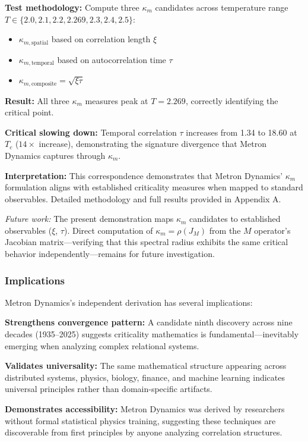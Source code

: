 \documentclass[11pt]{article}
\begin{document}
\textbf{Test methodology:} Compute three $\kappa_m$ candidates across temperature range $T \in \{2.0, 2.1, 2.2, 2.269, 2.3, 2.4, 2.5\}$:
\begin{itemize}[nosep]
    \item $\kappa_{m,\text{spatial}}$ based on correlation length $\xi$
    \item $\kappa_{m,\text{temporal}}$ based on autocorrelation time $\tau$
    \item $\kappa_{m,\text{composite}} = \sqrt{\xi\tau}$
\end{itemize}

\textbf{Result:} All three $\kappa_m$ measures peak at $T = 2.269$, correctly identifying the critical point.

\textbf{Critical slowing down:} Temporal correlation $\tau$ increases from 1.34 to 18.60 at $T_c$ ($14\times$ increase), demonstrating the signature divergence that Metron Dynamics captures through $\kappa_m$.

\textbf{Interpretation:} This correspondence demonstrates that Metron Dynamics' $\kappa_m$ formulation aligns with established criticality measures when mapped to standard observables. Detailed methodology and full results provided in Appendix A.

\textit{Future work:} The present demonstration maps $\kappa_m$ candidates to established observables ($\xi$, $\tau$). Direct computation of $\kappa_m = \rho(J_M)$ from the $M$ operator's Jacobian matrix---verifying that this spectral radius exhibits the same critical behavior independently---remains for future investigation.

\subsubsection{Implications}

Metron Dynamics's independent derivation has several implications:

\textbf{Strengthens convergence pattern:} A candidate ninth discovery across nine decades (1935--2025) suggests criticality mathematics is fundamental---inevitably emerging when analyzing complex relational systems.

\textbf{Validates universality:} The same mathematical structure appearing across distributed systems, physics, biology, finance, and machine learning indicates universal principles rather than domain-specific artifacts.

\textbf{Demonstrates accessibility:} Metron Dynamics was derived by researchers without formal statistical physics training, suggesting these techniques are discoverable from first principles by anyone analyzing correlation structures.
\end{document}
